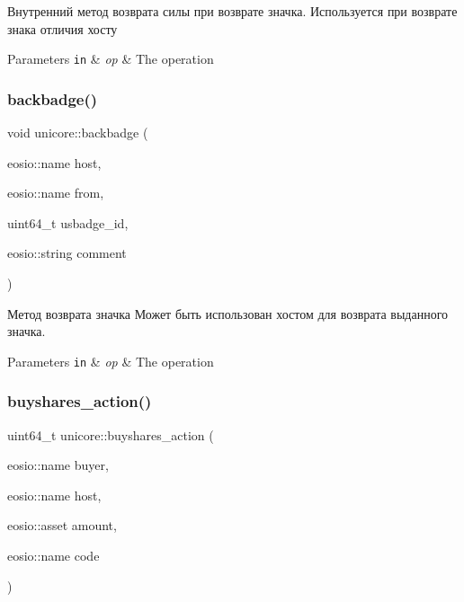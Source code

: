 Внутренний метод возврата силы при возврате значка. Используется при возврате знака отличия хосту 


\begin{DoxyParams}[1]{Parameters}
\mbox{\tt in}  & {\em op} & The operation \\
\hline
\end{DoxyParams}
\mbox{\label{classunicore_a6e7db779eb5836300fabe105012388c2}} 
\subsubsection{\texorpdfstring{backbadge()}{backbadge()}}
{\footnotesize\ttfamily void unicore\+::backbadge (\begin{DoxyParamCaption}\item[{eosio\+::name}]{host,  }\item[{eosio\+::name}]{from,  }\item[{uint64\+\_\+t}]{usbadge\+\_\+id,  }\item[{eosio\+::string}]{comment }\end{DoxyParamCaption})}



Метод возврата значка Может быть использован хостом для возврата выданного значка. 


\begin{DoxyParams}[1]{Parameters}
\mbox{\tt in}  & {\em op} & The operation \\
\hline
\end{DoxyParams}
\mbox{\label{classunicore_adcb2695fb82248b1037eba240d567fdc}} 
\subsubsection{\texorpdfstring{buyshares\+\_\+action()}{buyshares\_action()}}
{\footnotesize\ttfamily uint64\+\_\+t unicore\+::buyshares\+\_\+action (\begin{DoxyParamCaption}\item[{eosio\+::name}]{buyer,  }\item[{eosio\+::name}]{host,  }\item[{eosio\+::asset}]{amount,  }\item[{eosio\+::name}]{code }\end{DoxyParamCaption})\hspace{0.3cm}{\ttfamily [static]}}



